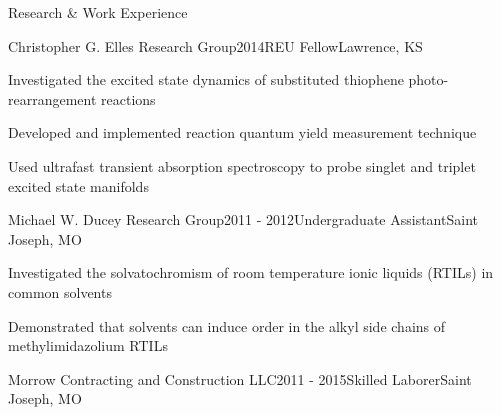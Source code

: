 \documentclass{resume} %
\begin{document}
\begin{rSection}{Research \& Work Experience}
\begin{rSubsection}{Christopher G. Elles Research Group}{2014}{REU Fellow}{Lawrence, KS}
	\item Investigated the excited state dynamics of substituted thiophene photo-rearrangement reactions
	\item Developed and implemented reaction quantum yield measurement technique
	\item Used ultrafast transient absorption spectroscopy to probe singlet and triplet excited state manifolds
\end{rSubsection}

\begin{rSubsection}{Michael W. Ducey Research Group}{2011 - 2012}{Undergraduate Assistant}{Saint Joseph, MO}
	\item Investigated the solvatochromism of room temperature ionic liquids (RTILs) in common solvents
	\item Demonstrated that solvents can induce order in the alkyl side chains of methylimidazolium RTILs
\end{rSubsection}

\begin{rSubsectionlistless}{Morrow Contracting and Construction LLC}{2011 - 2015}{Skilled Laborer}{Saint Joseph, MO}
\end{rSubsectionlistless}

\end{rSection}

\pagebreak
\end{document}

